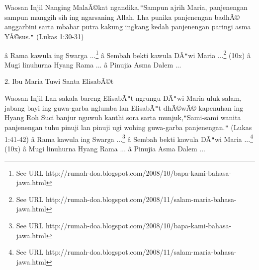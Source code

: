 
\newline



Waosan Injil
Nanging Mala\~A\copyright{}kat ngandika,\texttt{{}"{}}Sampun ajrih Maria, panjenengan sampun manggih sih ing ngarsaning Allah. Lha punika panjenengan badh\~A\copyright{} anggarbini sarta mbabar putra kakung ingkang kedah panjenengan paringi asma Y\~A\copyright{}sus.\texttt{{}"{}} (Lukas 1:30-31)


\newline
 \^a\*  Rama kawula ing Swarga ...\footnote{See URL http://rumah-doa.blogspot.com/2008/10/bapa-kami-bahasa-jawa.html}\newline
 \^a\*  Sembah bekti kawula D\~A\texttt{{}"{}}wi Maria ...\footnote{See URL http://rumah-doa.blogspot.com/2008/11/salam-maria-bahasa-jawa.html} (10x)\newline
 \^a\*  Mugi linuhurna Hyang Rama ...\newline
 \^a\*  Pinujia Asma Dalem ...\newline


2. Ibu Maria Tuwi Santa Elisab\~A\copyright{}t

\newline


Waosan Injil
Lan sakala bareng Elisab\~A\texttt{{}"{}}t ngrungu D\~A\texttt{{}"{}}wi Maria uluk salam, jabang bayi ing guwa-garba nglumba lan Elisab\~A\texttt{{}"{}}t dh\~A\copyright{}w\~A\copyright{} kapenuhan ing Hyang Roh Suci banjur nguwuh kanthi sora sarta munjuk,\texttt{{}"{}}Sami-sami wanita panjenengan tuhu pinuji lan pinuji ugi wohing guwa-garba panjenengan.\texttt{{}"{}} (Lukas 1:41-42)
\newline
 \^a\*  Rama kawula ing Swarga ...\footnote{See URL http://rumah-doa.blogspot.com/2008/10/bapa-kami-bahasa-jawa.html}\newline
 \^a\*  Sembah bekti kawula D\~A\texttt{{}"{}}wi Maria ...\footnote{See URL http://rumah-doa.blogspot.com/2008/11/salam-maria-bahasa-jawa.html} (10x)\newline
 \^a\*  Mugi linuhurna Hyang Rama ...\newline
 \^a\*  Pinujia Asma Dalem ...\newline

